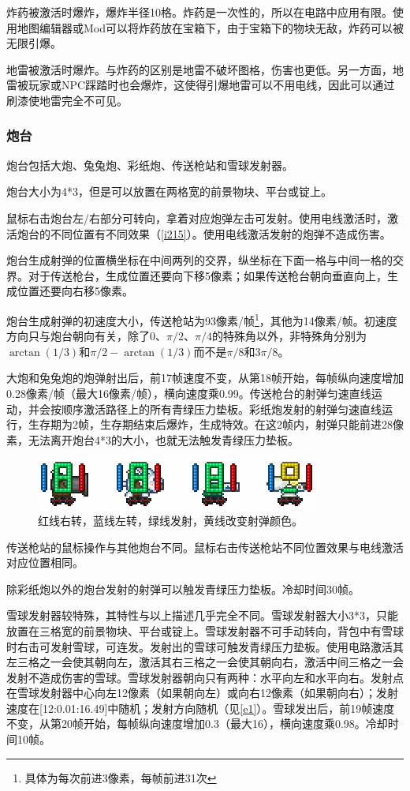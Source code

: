 炸药被激活时爆炸，爆炸半径10格。炸药是一次性的，所以在电路中应用有限。使用地图编辑器或Mod可以将炸药放在宝箱下，由于宝箱下的物块无敌，炸药可以被无限引爆。

地雷被激活时爆炸。与炸药的区别是地雷不破坏图格，伤害也更低。另一方面，地雷被玩家或NPC踩踏时也会爆炸，这使得引爆地雷可以不用电线，因此可以通过刷漆使地雷完全不可见。

\subsubsection{炮台}
炮台包括大炮、兔兔炮、彩纸炮、传送枪站和雪球发射器。

炮台大小为4*3，但是可以放置在两格宽的前景物块、平台或锭上。

鼠标右击炮台左/右部分可转向，拿着对应炮弹左击可发射。使用电线激活时，激活炮台的不同位置有不同效果（\autoref{i215}）。使用电线激活发射的炮弹不造成伤害。

炮台生成射弹的位置横坐标在中间两列的交界，纵坐标在下面一格与中间一格的交界。对于传送枪台，生成位置还要向下移5像素；如果传送枪台朝向垂直向上，生成位置还要向右移5像素。

炮台生成射弹的初速度大小，传送枪站为93像素/帧\footnote{具体为每次前进3像素，每帧前进31次}，其他为14像素/帧。初速度方向只与炮台朝向有关，除了0、$\pi/2$、$\pi/4$的特殊角以外，非特殊角分别为$\arctan(1/3)$和$\pi/2-\arctan(1/3)$而不是$\pi/8$和$3\pi/8$。

大炮和兔兔炮的炮弹射出后，前17帧速度不变，从第18帧开始，每帧纵向速度增加0.28像素/帧（最大16像素/帧），横向速度乘0.99。传送枪台的射弹匀速直线运动，并会按顺序激活路径上的所有青绿压力垫板。彩纸炮发射的射弹匀速直线运行，生存期为2帧，生存期结束后爆炸，生成特效。在这2帧内，射弹只能前进28像素，无法离开炮台4*3的大小，也就无法触发青绿压力垫板。

\begin{figure}[!h]
\centering
\includegraphics{images/215.png}
\caption{红线右转，蓝线左转，绿线发射，黄线改变射弹颜色。}
\label{i215}
\end{figure}

传送枪站的鼠标操作与其他炮台不同。鼠标右击传送枪站不同位置效果与电线激活对应位置相同。

除彩纸炮以外的炮台发射的射弹可以触发青绿压力垫板。冷却时间30帧。

雪球发射器较特殊，其特性与以上描述几乎完全不同。雪球发射器大小3*3，只能放置在三格宽的前景物块、平台或锭上。雪球发射器不可手动转向，背包中有雪球时右击可发射雪球，可连发。发射出的雪球可触发青绿压力垫板。使用电路激活其左三格之一会使其朝向左，激活其右三格之一会使其朝向右，激活中间三格之一会发射不造成伤害的雪球。雪球发射器朝向只有两种：水平向左和水平向右。发射点在雪球发射器中心向左12像素（如果朝向左）或向右12像素（如果朝向右）；发射速度在[12:0.01:16.49]中随机；发射方向随机（见\autoref{e1}）。雪球发出后，前19帧速度不变，从第20帧开始，每帧纵向速度增加0.3（最大16），横向速度乘0.98。冷却时间10帧。

